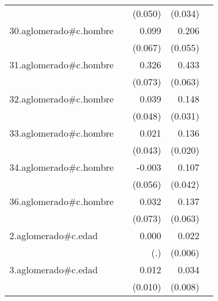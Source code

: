 {\begin{longtable}{l*{4}{D{.}{.}{-1}}}
            &                     &     (0.050)         &     (0.034)         &                     \\
\addlinespace
30.aglomerado#c.hombre&                     &       0.099         &       0.206\sym{***}&                     \\
            &                     &     (0.067)         &     (0.055)         &                     \\
\addlinespace
31.aglomerado#c.hombre&                     &       0.326\sym{***}&       0.433\sym{***}&                     \\
            &                     &     (0.073)         &     (0.063)         &                     \\
\addlinespace
32.aglomerado#c.hombre&                     &       0.039         &       0.148\sym{***}&                     \\
            &                     &     (0.048)         &     (0.031)         &                     \\
\addlinespace
33.aglomerado#c.hombre&                     &       0.021         &       0.136\sym{***}&                     \\
            &                     &     (0.043)         &     (0.020)         &                     \\
\addlinespace
34.aglomerado#c.hombre&                     &      -0.003         &       0.107\sym{*}  &                     \\
            &                     &     (0.056)         &     (0.042)         &                     \\
\addlinespace
36.aglomerado#c.hombre&                     &       0.032         &       0.137\sym{*}  &                     \\
            &                     &     (0.073)         &     (0.063)         &                     \\
\addlinespace
2.aglomerado#c.edad&                     &       0.000         &       0.022\sym{***}&                     \\
            &                     &         (.)         &     (0.006)         &                     \\
\addlinespace
3.aglomerado#c.edad&                     &       0.012         &       0.034\sym{***}&                     \\
            &                     &     (0.010)         &     (0.008)         &                     \\

\end{longtable}}
